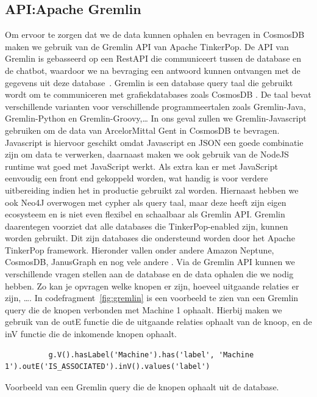 \subsection{API:\@ Apache Gremlin}
Om ervoor te zorgen dat we de data kunnen ophalen en bevragen in CosmosDB maken we gebruik van de Gremlin API van Apache TinkerPop.
De API van Gremlin is gebasseerd op een RestAPI die communiceert tussen de database en de chatbot, waardoor we na bevraging een antwoord kunnen ontvangen met de gegevens uit deze database~\autocite{Medina2021}.
Gremlin is een database query taal die gebruikt wordt om te communiceren met grafiekdatabases zoals CosmosDB \autocite{Tinkerpop2023}.\@
De taal bevat verschillende varianten voor verschillende programmeertalen zoals Gremlin-Java, Gremlin-Python en Gremlin-Groovy,\dots
In ons geval zullen we Gremlin-Javascript gebruiken om de data van ArcelorMittal Gent in CosmosDB te bevragen. 
Javascript is hiervoor geschikt omdat Javascript en JSON een goede combinatie zijn om data te verwerken, daarnaast maken we ook gebruik van de NodeJS runtime wat goed met JavaScript werkt. 
Als extra kan er met JavaScript eenvoudig een front end gekoppeld worden, wat handig is voor verdere uitbereiding indien het in productie gebruikt zal worden.
Hiernaast hebben we ook Neo4J overwogen met cypher als query taal, maar deze heeft zijn eigen ecosysteem en is niet even flexibel en schaalbaar als Gremlin API.\@
Gremlin daarentegen voorziet dat alle databases die TinkerPop-enabled zijn, kunnen worden gebruikt. Dit zijn databases die ondersteund worden door het Apache TinkerPop framework.
Hieronder vallen onder andere Amazon Neptune, CosmosDB, JanusGraph en nog vele andere \autocite{Tinkerpop2023a}.
Via de Gremlin API kunnen we verschillende vragen stellen aan de database en de data ophalen die we nodig hebben. Zo kan je opvragen welke knopen er zijn, hoeveel uitgaande relaties er zijn, \dots.
In codefragment~\ref{fig:gremlin} is een voorbeeld te zien van een Gremlin query die de knopen verbonden met Machine 1 ophaalt.
Hierbij maken we gebruik van de outE functie die de uitgaande relaties ophaalt van de knoop, en de inV functie die de inkomende knopen ophaalt.

\begin{listing}
     \begin{verbatim}
          g.V().hasLabel('Machine').has('label', 'Machine 1').outE('IS_ASSOCIATED').inV().values('label')
     \end{verbatim}
     \caption[Voorbeeld Gremlin query]{\label{fig:gremlin}Voorbeeld van een Gremlin query die de knopen ophaalt uit de database.}
\end{listing}


